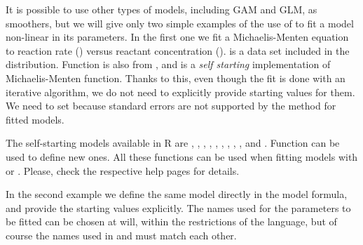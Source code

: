 \documentclass[krantz2]{krantz}\usepackage{knitr}%
\begin{document}
It is possible to use other types of models, including GAM and GLM, as smoothers, but we will give only two simple examples of the use of  to fit a model non-linear in its parameters. In the first one we fit a Michaelis-Menten equation to reaction rate () versus reactant concentration ().  is a data set included in the \Rlang distribution. Function 
is also from \Rlang, and is a \emph{self starting} implementation of Michaelis-Menten function. Thanks to this, even though the fit is done with an iterative algorithm, we do not need to explicitly provide starting values for them. We need to set  because
standard errors are not supported by the  method for  fitted models.

\begin{knitrout}\footnotesize
{}\color{fgcolor}\begin{kframe}
\begin{alltt}
    \hlopt{+}
  \hlstd{()} \hlopt{+}
  \hlstd{(} \hlstd{=} \hlstd{,}
                \hlopt{~} 
               \hlstd{=} \hlstd{)}
\end{alltt}
\end{kframe}
\end{knitrout}

The self-starting models available in R are , , , , , , , , , and . Function  can be used to define new ones. All these functions can be used when fitting models with  or . Please, check the respective help pages for details.

In the second example we define the same model directly in the model formula, and provide the starting values explicitly. The names used for the parameters to be fitted can be chosen at will, within the restrictions of the \Rlang language, but of course the names used in  and  must match each other.
\end{document}
